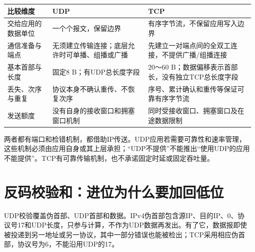 \begin{wideblock}

\par\medskip\noindent\begin{minipage}{\linewidth}\fontsize{9.3}{12}\selectfont\begin{tabularx}{\linewidth}{@{}YYY@{}}
\toprule\noalign{}
\begin{minipage}[b]{\linewidth}\raggedright
比较维度
\end{minipage} & \begin{minipage}[b]{\linewidth}\raggedright
UDP
\end{minipage} & \begin{minipage}[b]{\linewidth}\raggedright
TCP
\end{minipage} \\
\midrule\noalign{}


交给应用的数据单位 & 一个个报文，保留边界 & 有序字节流，不保留应用写入边界 \\
通信准备与端点 & 无须建立传输连接；底层允许时可单播、组播或广播 & 先建立一对端点间的全双工连接，不提供广播/组播连接 \\
基本首部与长度 & 固定8 B；有UDP总长度字段 & 20～60 B；数据偏移表示首部长，没有独立TCP总长度字段 \\
丢失、次序与重复 & 协议本身不确认重传、不恢复次序 & 序号、累计确认和重传等保证可靠有序字节流 \\
发送额度 & 没有自身的接收窗口和拥塞窗口机制 & 同时受接收窗口、拥塞窗口及在途数据限制 \\
\bottomrule\end{tabularx}
\end{minipage}\par\medskip

\end{wideblock}

两者都有端口和检错机制，都借助IP传送。UDP应用若需要可靠性和速率管理，这些机制必须由应用自身或其上层承担；``UDP不提供''不能推出``使用UDP的应用不能提供''。TCP有可靠传输机制，也不承诺固定时延或固定吞吐量。

\section{反码校验和：进位为什么要加回低位}\label{CN05-03}

UDP校验覆盖伪首部、UDP首部和数据。IPv4伪首部包含源IP、目的IP、0、协议号17和UDP长度，只参与计算，不作为UDP数据再发出。有了它，数据报即使被投递到另一地址或另一协议，其中一部分错误也能被检出；TCP采用相应伪首部，协议号为6，不能沿用UDP的17。


